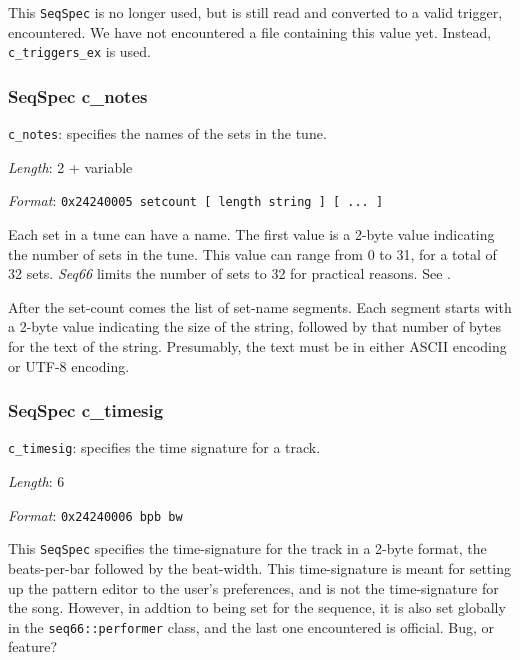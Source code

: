    This \texttt{SeqSpec} is no longer used, but is still read and
   converted to a valid trigger, encountered.
   We have not encountered a file containing this value yet.
   Instead, \texttt{c\_triggers\_ex} is used.

\subsubsection{SeqSpec c\_notes}
\label{subsubsec:midi_format_track_seqspec_notes}


   \begin{description}
      \item \texttt{c\_notes}: specifies the names of the sets in the tune.
      \item \textsl{Length}: 2 + variable
      \item \textsl{Format}: \texttt{0x24240005 setcount [ length string ] [ ... ] }
   \end{description}

   Each set in a tune can have a name.  The first value is a 2-byte value
   indicating the number of sets in the tune.  This value can range from
   0 to 31, for a total of 32 sets.
   \textsl{Seq66} limits the number of sets to 32 for practical reasons.
   See .

   After the set-count comes the list of set-name segments.  Each segment
   starts with a 2-byte value indicating the size of the string, followed
   by that number of bytes for the text of the string.  Presumably, the
   text must be in either ASCII encoding or UTF-8 encoding.

\subsubsection{SeqSpec c\_timesig}
\label{subsubsec:midi_format_track_seqspec_timesig}


   \begin{description}
      \item \texttt{c\_timesig}: specifies the time signature for a track.
      \item \textsl{Length}: 6
      \item \textsl{Format}: \texttt{0x24240006 bpb bw}
   \end{description}

   This \texttt{SeqSpec} specifies the time-signature for the track in a 2-byte
   format, the beats-per-bar followed by the beat-width.
   This time-signature is meant for setting up the pattern editor to the
   user's preferences, and is not the time-signature for the song.
   However, in addtion to being set for the sequence, it is also
   set globally in the \texttt{seq66::performer} class, and the last one
   encountered is official.
   Bug, or feature?

